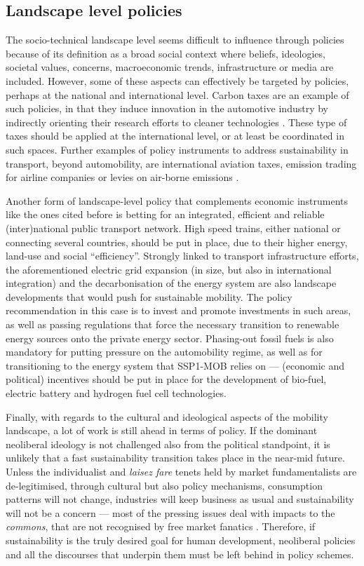 \subsection{Landscape level policies}
\label{ss:results:policies_landscape}
The socio-technical landscape level seems difficult to influence through policies because of its definition as a broad social context where beliefs, ideologies, societal values, concerns, macroeconomic trends, infrastructure or media are included. However, some of these aspects can effectively be targeted by policies, perhaps at the national and international level. Carbon taxes are an example of such policies, in that they induce innovation in the automotive industry by indirectly orienting their research efforts to cleaner technologies \parencite{aghion2016_CarbonTaxesPath}. These type of taxes should be applied at the international level, or at least be coordinated in such spaces. Further examples of policy instruments to address sustainability in transport, beyond automobility, are international aviation taxes, emission trading for airline companies or levies on air-borne emissions \parencite{peeters2006_Innovationtowardstourism}.

Another form of landscape-level policy that complements economic instruments like the ones cited before is betting for an integrated, efficient and reliable (inter)national public transport network. High speed trains, either national or connecting several countries, should be put in place, due to their higher energy, land-use and social ``efficiency''. Strongly linked to transport infrastructure efforts, the aforementioned electric grid expansion (in size, but also in international integration) and the decarbonisation of the energy system are also landscape developments that would push for sustainable mobility. The policy recommendation in this case is to invest and promote investments in such areas, as well as passing regulations that force the necessary transition to renewable energy sources onto the private energy sector. Phasing-out fossil fuels is also mandatory for putting pressure on the automobility regime, as well as for transitioning to the energy system that SSP1-MOB relies on --- (economic and political) incentives should be put in place for the development of bio-fuel, electric battery and hydrogen fuel cell technologies.

Finally, with regards to the cultural and ideological aspects of the mobility landscape, a lot of work is still ahead in terms of policy. If the dominant neoliberal ideology is not challenged also from the political standpoint, it is unlikely that a fast sustainability transition takes place in the near-mid future. Unless the individualist and \emph{laisez fare} tenets held by market fundamentalists are de-legitimised, through cultural but also policy mechanisms, consumption patterns will not change, industries will keep business as usual and sustainability will not be a concern --- most of the pressing issues deal with impacts to the \emph{commons}, that are not recognised by free market fanatics \parencite{kumi2014_Canpost2015,cervantes2013_IdeologyNeoliberalismSustainable}. Therefore, if sustainability is the truly desired goal for human development, neoliberal policies and all the discourses that underpin them must be left behind in policy schemes.